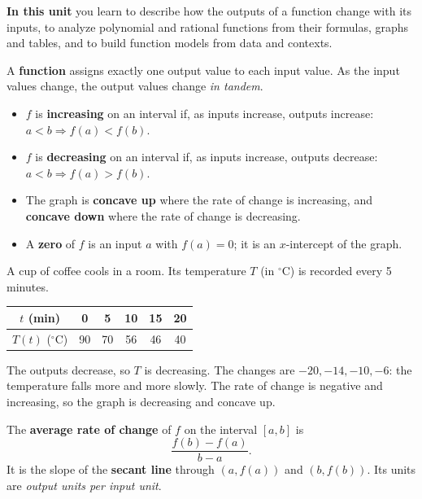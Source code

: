 \documentclass[11pt]{article}
\begin{document}

\textbf{In this unit} you learn to describe how the outputs of a function change with its inputs, to analyze polynomial and rational functions from their formulas, graphs and tables, and to build function models from data and contexts.

A \textbf{function} assigns exactly one output value to each input value. As the input values change, the output values change \emph{in tandem}.

\begin{keyidea}
\begin{itemize}
\item $f$ is \textbf{increasing} on an interval if, as inputs increase, outputs increase: $a<b \Rightarrow f(a)<f(b)$.
\item $f$ is \textbf{decreasing} on an interval if, as inputs increase, outputs decrease: $a<b \Rightarrow f(a)>f(b)$.
\item The graph is \textbf{concave up} where the rate of change is increasing, and \textbf{concave down} where the rate of change is decreasing.
\item A \textbf{zero} of $f$ is an input $a$ with $f(a)=0$; it is an $x$-intercept of the graph.
\end{itemize}
\end{keyidea}

\begin{example}
A cup of coffee cools in a room. Its temperature $T$ (in $^\circ$C) is recorded every 5 minutes.
\begin{center}\begin{tabular}{c|ccccc}
$t$ (min) & 0 & 5 & 10 & 15 & 20\\\hline
$T(t)$ ($^\circ$C) & 90 & 70 & 56 & 46 & 40
\end{tabular}\end{center}
\sol The outputs decrease, so $T$ is decreasing. The changes are $-20, -14, -10, -6$: the temperature falls more and more slowly. The rate of change is negative and increasing, so the graph is decreasing and concave up.
\end{example}

\begin{keyidea}
The \textbf{average rate of change} of $f$ on the interval $[a,b]$ is
\[ \frac{f(b)-f(a)}{b-a}. \]
It is the slope of the \textbf{secant line} through $(a,f(a))$ and $(b,f(b))$. Its units are \emph{output units per input unit}.
\end{keyidea}
\end{document}
